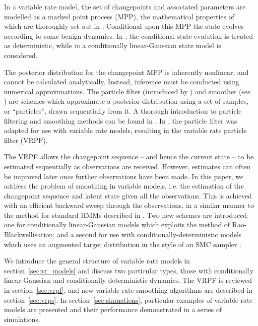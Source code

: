 \documentclass[journal]{IEEEtran}
\begin{document}
In a variable rate model, the set of changepoints and associated parameters are modelled as a marked point process (MPP), the mathematical properties of which are thoroughly set out in \cite{Jacobsen2006}. Conditional upon this MPP the state evolves according to some benign dynamics. In \cite{Godsill2007,Whiteley2011}, the conditional state evolution is treated as deterministic, while in \cite{Godsill2007a,Christensen2012} a conditionally linear-Gaussian state model is considered.

The posterior distribution for the changepoint MPP is inherently nonlinear, and cannot be calculated analytically. Instead, inference must be conducted using numerical approximations. The particle filter (introduced by \cite{Gordon1993}) and smoother (see \cite{Doucet2000a,Godsill2004}) are schemes which approximate a posterior distribution using a set of samples, or ``particles'', drawn sequentially from it.  A thorough introduction to particle filtering and smoothing methods can be found in \cite{Cappe2007,Doucet2009}. In \cite{Godsill2007a,Godsill2007,Whiteley2011}, the particle filter was adapted for use with variable rate models, resulting in the variable rate particle filter (VRPF).

The VRPF allows the changepoint sequence -- and hence the current state -- to be estimated sequentially as observations are received. However, estimates can often be improved later once further observations have been made. In this paper, we address the problem of smoothing in variable models, i.e. the estimation of the changepoint sequence and latent state given all the observations. This is achieved with an efficient backward sweep through the observations, in a similar manner to the method for standard HMMs described in \cite{Godsill2004}. Two new schemes are introduced: one for conditionally linear-Gaussian models which exploits the method of Rao-Blackwellisation; and a second for use with conditionally-deterministic models which uses an augmented target distribution in the style of an SMC sampler \cite{DelMoral2006}.

We introduce the general structure of variable rate models in section~\ref{sec:vr_models} and discuss two particular types, those with conditionally linear-Gaussian and conditionally deterministic dynamics. The VRPF is reviewed in section~\ref{sec:vrpf}, and new variable rate smoothing algorithms are described in section~\ref{sec:vrps}. In section~\ref{sec:simuations}, particular examples of variable rate models are presented and their performance demonstrated in a series of simulations.
\end{document}
